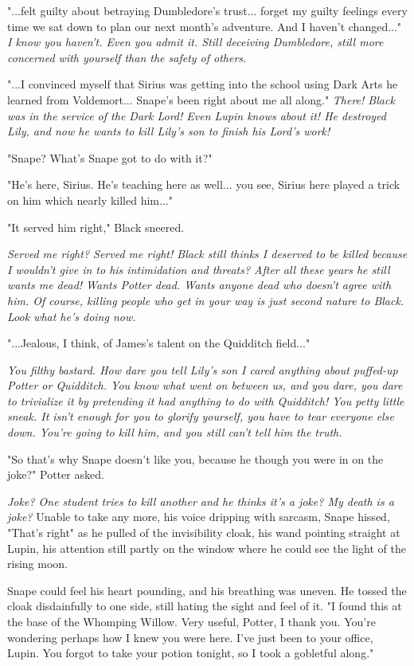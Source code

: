 "...felt guilty about betraying Dumbledore's trust... forget my guilty feelings every time we sat down to plan our next month's adventure. And I haven't changed..." \emph{I know you haven't. Even you admit it. Still deceiving Dumbledore, still more concerned with yourself than the safety of others.}

"...I convinced myself that Sirius was getting into the school using Dark Arts he learned from Voldemort... Snape's been right about me all along." \emph{There! Black was in the service of the Dark Lord! Even Lupin knows about it! He destroyed Lily, and now he wants to kill Lily's son to finish his Lord's work!}

"Snape? What's Snape got to do with it?"

"He's here, Sirius. He's teaching here as well... you see, Sirius here played a trick on him which nearly killed him..."

"It served him right," Black sneered.

\emph{Served me right? Served me right! Black still thinks I deserved to be killed because I wouldn't give in to his intimidation and threats? After all these years he still wants me dead! Wants Potter dead. Wants anyone dead who doesn't agree with him. Of course, killing people who get in your way is just second nature to Black. Look what he's doing now.}

"...Jealous, I think, of James's talent on the Quidditch field..."

\emph{You filthy bastard. How dare you tell Lily's son I cared anything about puffed-up Potter or Quidditch. You know what went on between us, and you dare, you dare to trivialize it by pretending it had anything to do with Quidditch! You petty little sneak. It isn't enough for you to glorify yourself, you have to tear everyone else down. You're going to kill him, and you still can't tell him the truth.}

"So that's why Snape doesn't like you, because he though you were in on the joke?" Potter asked.

\emph{Joke? One student tries to kill another and he thinks it's a joke? My death is a joke?} Unable to take any more, his voice dripping with sarcasm, Snape hissed, "That's right" as he pulled of the invisibility cloak, his wand pointing straight at Lupin, his attention still partly on the window where he could see the light of the rising moon.

Snape could feel his heart pounding, and his breathing was uneven. He tossed the cloak disdainfully to one side, still hating the sight and feel of it. "I found this at the base of the Whomping Willow. Very useful, Potter, I thank you. You're wondering perhaps how I knew you were here. I've just been to your office, Lupin. You forgot to take your potion tonight, so I took a gobletful along."

